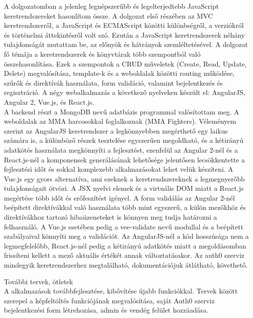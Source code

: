 
A dolgozatomban a jelenleg legnépszerűbb és legelterjedtebb JavaScript keretrendszereket hasonlítom össze. A dolgozat első részében az MVC keretrendszerről, a JavaScript és ECMAScript közötti különbségről, a verziókról és történelmi áttekintésről volt szó. Ezután a JavaScript keretrendszerek néhány tulajdonságát mutattam be, az előnyök és hátrányok szemléltetésével. 
A dolgozat fő témája a keretrendszerek és könyvtárak több szempontból való összehasonlítása. Ezek a szempontok a CRUD műveletek (Create, Read, Update, Delete) megvalósítása, template-k és a weboldalak közötti routing működése, szűrők és direktívák használata, form validáció, valamint bejelentkezés és regisztráció. 
A négy webalkalmazás a következő nyelveken készült el: AngularJS, Angular 2, Vue.js, és React.js. \\A backend részt a MongoDB nevű adatbázis programmal valósítottam meg. A weboldalak az MMA harcosokkal foglalkoznak (MMA Fighters).
Véleményem szerint az AngularJS keretrendszer a legkönnyebben megérthető egy laikus számára is, a különböző részek tesztelése egyszerűen megoldható, és a kétirányú adatkötés használata megkönnyíti a fejlesztést, ezenfelül az Angular 2-nél és a React.js-nél a komponensek generálásának lehetősége jelentősen lecsökkentette a fejlesztési időt és sokkal komplexebb alkalmazásokat lehet velük készíteni. A Vue.js egy gyors alternatíva, ami ezeknek a keretrendszereknek a legmegnyerőbb tulajdonságait ötvözi. A JSX nyelvi elemek és a virtuális DOM miatt a React.js megértése több időt és erőfeszítést igényel.
A form validálás az Angular 2-nél beépített direktívákkal való használata több mint egyszerű, a külön mezőkhöz és direktívákhoz tartozó hibaüzeneteket is könnyen meg tudja határozni a felhasználó. A Vue.js esetében pedig a vee-validate nevű modullal és a beépített szabályaival könnyíti meg a validációt. Az AngularJS-nél a kód hosszúsága nem a legmegfelelőbb, React.js-nél pedig a kétirányú adatkötés miatt a megoldásomban frissíteni kellett a mező aktuális értékét annak változtatásakor.
Az auth0 szerviz mindegyik keretrendszerhez megtalálható, dokumentációjuk átlátható, követhető. 

További tervek, ötletek \\
A alkalmazások továbbfejlesztése, kibővítése újabb funkciókkal. Tervek között szerepel a képfeltöltés funkciójának megvalósítása, saját Auth0 szerviz bejelentkezési form létrehozása, admin és vendég felület hozzáadása.

